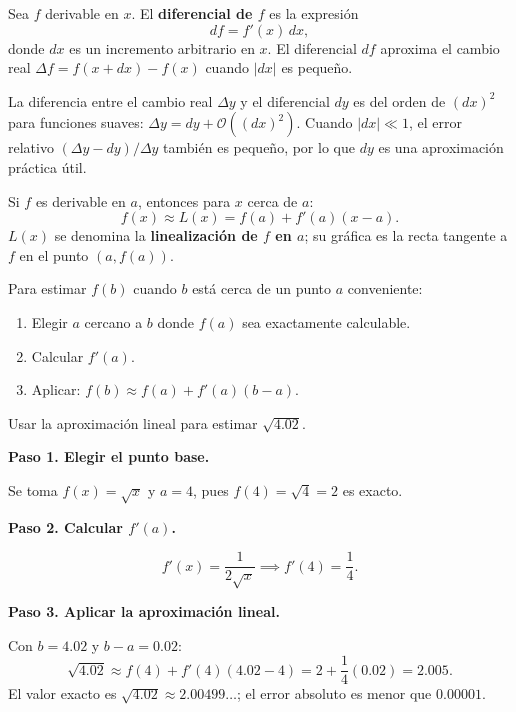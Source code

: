 \begin{definition}
Sea $f$ derivable en $x$. El \textbf{diferencial de $f$} es la expresión
\[
df = f'(x)\,dx,
\]
donde $dx$ es un incremento arbitrario en $x$. El diferencial $df$
aproxima el cambio real $\Delta f = f(x+dx)-f(x)$ cuando $|dx|$
es pequeño.
\end{definition}

\begin{rem}
La diferencia entre el cambio real $\Delta y$ y el diferencial $dy$
es del orden de $(dx)^2$ para funciones suaves:
$\Delta y = dy + \mathcal{O}\!\left((dx)^2\right)$.
Cuando $|dx|\ll 1$, el error relativo $(\Delta y - dy)/\Delta y$
también es pequeño, por lo que $dy$ es una aproximación práctica útil.
\end{rem}

\begin{theorem}
Si $f$ es derivable en $a$, entonces para $x$ cerca de $a$:
\[
f(x) \approx L(x) = f(a) + f'(a)(x - a).
\]
$L(x)$ se denomina la \textbf{linealización de $f$ en $a$}; su gráfica
es la recta tangente a $f$ en el punto $(a,f(a))$.
\end{theorem}

\begin{pasos}
Para estimar $f(b)$ cuando $b$ está cerca de un punto $a$ conveniente:
\begin{enumerate}
    \item Elegir $a$ cercano a $b$ donde $f(a)$ sea exactamente
    calculable.
    \item Calcular $f'(a)$.
    \item Aplicar: $f(b) \approx f(a) + f'(a)(b-a)$.
\end{enumerate}
\end{pasos}

\begin{example}
Usar la aproximación lineal para estimar $\sqrt{4.02}$.
\begin{myproof}
\textbf{Paso 1. Elegir el punto base.}

Se toma $f(x)=\sqrt{x}$ y $a=4$, pues $f(4)=\sqrt{4}=2$ es exacto.

\textbf{Paso 2. Calcular $f'(a)$.}

\[
f'(x) = \frac{1}{2\sqrt{x}} \implies f'(4) = \frac{1}{4}.
\]

\textbf{Paso 3. Aplicar la aproximación lineal.}

Con $b=4.02$ y $b-a=0.02$:
\[
\sqrt{4.02} \approx f(4) + f'(4)(4.02-4)
= 2 + \frac{1}{4}(0.02) = \boxed{2.005}.
\]
El valor exacto es $\sqrt{4.02}\approx 2.00499\ldots$; el error
absoluto es menor que $0.00001$.
\end{myproof}
\end{example}

